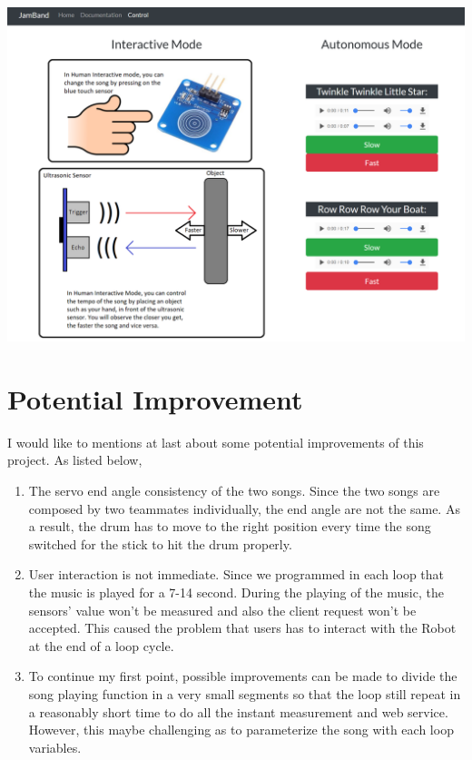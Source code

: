 \documentclass[a0,landscape]{a0poster}
\begin{document}
\begin{multicols}{4}
\begin{center}
\includegraphics[width=0.8\linewidth]{website2}
\end{center}\vspace{1cm}

\section*{Potential Improvement}
I would like to mentions at last about some potential improvements of this project. As listed below,
\begin{enumerate}
\item The servo end angle consistency of the two songs. Since the two songs are composed by two teammates individually, the end angle are not the same. As a result, the drum has to move to the right position every time the song switched for the stick to hit the drum properly.
\item User interaction is not immediate. Since we programmed in each loop that the music is played for a 7-14 second. During the playing of the music, the sensors' value won't be measured and also the client request won't be accepted. This caused the problem that users has to interact with the Robot at the end of a loop cycle. 
\item To continue my first point, possible improvements can be made to divide the song playing function in a very small segments so that the loop still repeat in a reasonably short time to do all the instant measurement and web service. However, this maybe challenging as to parameterize the song with each loop variables.
\end{enumerate}


\end{multicols}
\end{document}
